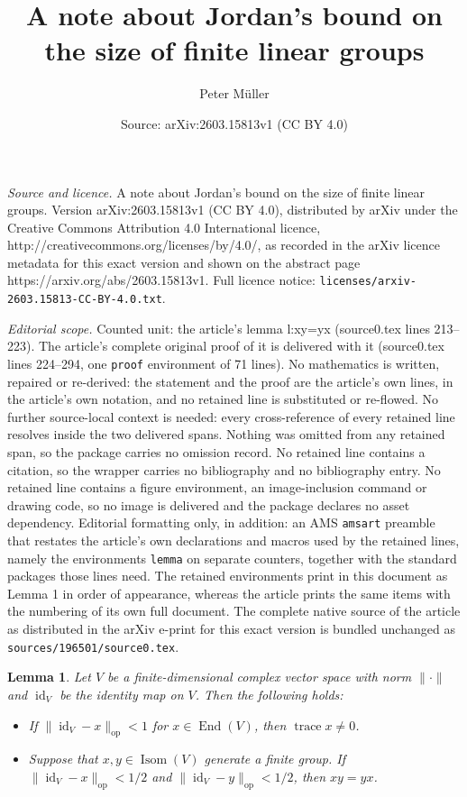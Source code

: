\documentclass[10pt,a4paper]{amsart}
\title{A note about Jordan's bound on the size of finite linear groups}
\author{Peter M\"uller}
\date{Source: arXiv:2603.15813v1 (CC BY 4.0)}
\newtheorem{lemma}{Lemma}
\DeclareMathOperator{\End}{End}
\DeclareMathOperator{\U}{Isom}
\DeclareMathOperator{\id}{id}
\newcommand*{\norm}[1]{\lVert#1\rVert}
\newcommand*{\normop}[1]{\lVert#1\rVert_\text{op}}
\DeclareMathOperator{\trace}{trace}
\begin{document}
\maketitle

\noindent\emph{Source and licence.} A note about Jordan's bound on the size of finite linear groups. Version arXiv:2603.15813v1 (CC BY 4.0), distributed by arXiv under the Creative Commons Attribution 4.0 International licence, http://creativecommons.org/licenses/by/4.0/, as recorded in the arXiv licence metadata for this exact version and shown on the abstract page https://arxiv.org/abs/2603.15813v1. Full licence notice: \texttt{licenses/arxiv-2603.15813-CC-BY-4.0.txt}.\par\smallskip

\noindent\textit{Editorial scope.} Counted unit: the article's lemma l:xy=yx (source0.tex lines 213--223). The article's complete original proof of it is delivered with it (source0.tex lines 224--294, one \texttt{proof} environment of 71 lines). No mathematics is written, repaired or re-derived: the statement and the proof are the article's own lines, in the article's own notation, and no retained line is substituted or re-flowed.  No further source-local context is needed: every cross-reference of every retained line resolves inside the two delivered spans.  Nothing was omitted from any retained span, so the package carries no omission record.  No retained line contains a citation, so the wrapper carries no bibliography and no bibliography entry.  No retained line contains a figure environment, an image-inclusion command or drawing code, so no image is delivered and the package declares no asset dependency.  Editorial formatting only, in addition: an AMS \texttt{amsart} preamble that restates the article's own declarations and macros used by the retained lines, namely the environments \texttt{lemma} on separate counters, together with the standard packages those lines need.  The retained environments print in this document as Lemma 1 in order of appearance, whereas the article prints the same items with the numbering of its own full document.  The complete native source of the article as distributed in the arXiv e-print for this exact version is bundled unchanged as \texttt{sources/196501/source0.tex}.
\begin{lemma}\label{l:xy=yx}
  Let $V$ be a finite-dimensional complex vector space with norm
  $\norm{\cdot}$ and $\id_V$ be the identity map on $V$. Then the
  following holds:
  \begin{itemize}
  \item[(a)] If $\normop{\id_V-x}<1$ for $x\in\End(V)$, then $\trace
    x\ne0$.
  \item[(b)] Suppose that $x,y\in\U(V)$ generate a finite group. If
    $\normop{\id_V-x}<1/2$ and $\normop{\id_V-y}<1/2$, then $xy=yx$.
  \end{itemize}
\end{lemma}
\end{document}
